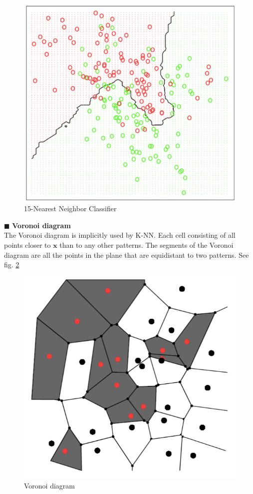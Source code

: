 \documentclass[../main.tex]{subfiles}
\begin{document}
\begin{figure}
    \centering
    \includegraphics[scale = 0.25]{lectures/3_K_nn/3_15nn_eg.png}
    \caption{15-Nearest Neighbor Classifier}
    \label{fig:3_15nn_eg}
\end{figure}

\noindent$\blacksquare$ \textbf{Voronoi diagram}\\
The Voronoi diagram is implicitly used by K-NN. Each cell consisting of all points closer to $\mathbf{x}$ than to any other patterns. The segments of the Voronoi diagram are all the points in the plane that are equidistant to two patterns. See fig. \ref{fig:voronoi_diagram}
\begin{figure}[h]
    \centering
    \includegraphics[scale = 0.3]{lectures/3_K_nn/3_voronoi_diagram.png}
    \caption{Voronoi diagram}
    \label{fig:voronoi_diagram}
\end{figure}
\end{document}
